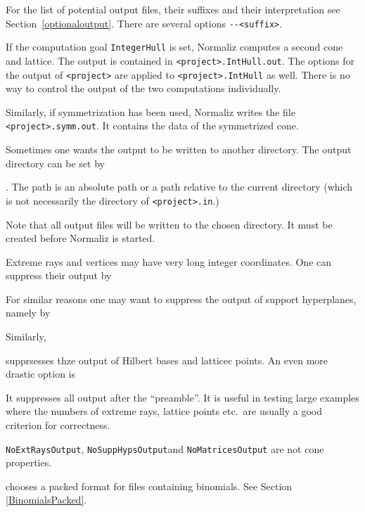 For the list of potential output files, their suffixes and their interpretation
see Section~\ref{optionaloutput}. There are several options \verb|--<suffix>|.

If the computation goal \verb|IntegerHull| is set, Normaliz computes a second cone and lattice. The output is contained in \verb|<project>.IntHull.out|. The options for the output of \verb|<project>| are applied to \verb|<project>.IntHull| as well. There is no way to control the output of the two computations individually.

Similarly, if symmetrization has been used, Normaliz writes the file \verb|<project>.symm.out|. It contains the data of the symmetrized cone.

Sometimes one wants the output to be written to another directory. The output directory can be set by
\begin{itemize}
	. The path  is an absolute path or a path relative to the current directory (which is not necessarily the directory of \verb|<project>.in|.)
\end{itemize}
Note that all output files will be written to the chosen directory. It must be created before Normaliz is started.

Extreme rays and vertices may have very long integer coordinates. One can suppress their output by
\begin{itemize}
	\itemtt[NoExtRaysOutput]
\end{itemize}
For similar reasons one may want to suppress the output of support hyperplanes, namely by
\begin{itemize}
	\itemtt[NoSuppHypsOutput]
\end{itemize}
Similarly,
\begin{itemize}
	\itemtt[NoHilbertBasisOutput]
\end{itemize}
supprsesses thze output of Hilbert bases and latticec points.
An even more drastic option is
\begin{itemize}
	\itemtt[NoMatricesOutput]
\end{itemize}
It suppresses all output after the ``preamble''. It is useful in testing large examples where the numbers of extreme rays, lattice points etc.\ are usually a good criterion for correctness.

\verb|NoExtRaysOutput|, \verb|NoSuppHypsOutput|and \verb|NoMatricesOutput| are not cone properties.

\begin{itemize}
	\itemtt[BinomialsPacked] chooses a packed format for files containing binomials. See Section \ref{BinomialsPacked}.
\end{itemize}


